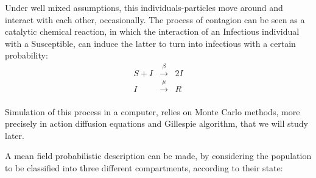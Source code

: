 Under well mixed assumptions, this individuals-particles move around and interact with each other, occasionally. The process of contagion can be seen as a catalytic chemical reaction, in which the interaction of an Infectious individual with a Susceptible, can induce the latter to turn into infectious with a certain probability:
\begin{eqnarray*}
 S + I &\xrightarrow{\beta}& 2I \\
 I &\xrightarrow{\mu}& R \\
\end{eqnarray*}

Simulation of this process in a computer, relies on Monte Carlo methods, more precisely in action diffusion equations and Gillespie algorithm, that we will study later.

A mean field probabilistic description can be made, by considering the population to be classified into three different compartments, according to their state:

